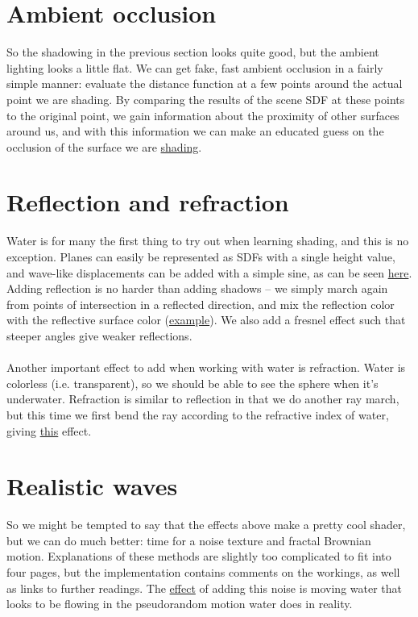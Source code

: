 \documentclass[abstract=off,oneside]{scrreprt}
\begin{document}
\section*{Ambient occlusion}
\label{sec-7}
\label{sec:ao}
So the shadowing in the previous section looks quite good, but the
ambient lighting looks a little flat. We can get fake, fast ambient
occlusion in a fairly simple manner: evaluate the distance function at
a few points around the actual point we are shading. By comparing the
results of the scene SDF at these points to the original point, we
gain information about the proximity of other surfaces around us, and
with this information we can make an educated guess on the occlusion
of the surface we are \hyperref[fig:ao]{shading}.

\section*{Reflection and refraction}
\label{sec-8}
\label{sec:water}
Water is for many the first thing to try out when learning shading,
and this is no exception. Planes can easily be represented as SDFs
with a single height value, and wave-like displacements can be added
with a simple sine, as can be seen \hyperref[fig:simplewater]{here}. Adding reflection is no
harder than adding shadows -- we simply march again from points of
intersection in a reflected direction, and mix the reflection color
with the reflective surface color (\hyperref[fig:reflection]{example}). We also add a fresnel
effect such that steeper angles give weaker reflections.
\\\\
Another important effect to add when working with water is
refraction. Water is colorless (i.e. transparent), so we should be
able to see the sphere when it's underwater. Refraction is similar to
reflection in that we do another ray march, but this time we first
bend the ray according to the refractive index of water, giving
\hyperref[fig:refraction]{this} effect.

\section*{Realistic waves}
\label{sec-9}
\label{sec:realisticwaves}
So we might be tempted to say that the effects above make a pretty
cool shader, but we can do much better: time for a noise texture and
fractal Brownian motion. Explanations of these methods are slightly
too complicated to fit into four pages, but the implementation
contains comments on the workings, as well as links to further
readings. The \hyperref[fig:noise]{effect} of adding this noise is moving water that
looks to be flowing in the pseudorandom motion water does in reality.
\end{document}
